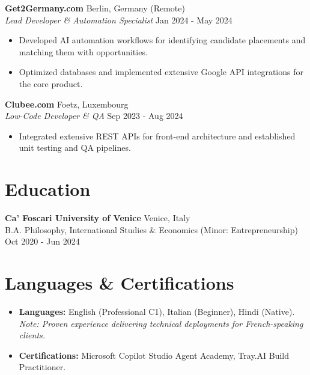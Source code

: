 \documentclass[11pt,a4paper]{article}
\begin{document}
\vspace{0.5em}
\noindent
\textbf{Get2Germany.com} \hfill Berlin, Germany (Remote)\\
\textit{Lead Developer \& Automation Specialist} \hfill Jan 2024 - May 2024
\begin{itemize}[leftmargin=*,noitemsep]
    \item Developed AI automation workflows for identifying candidate placements and matching them with opportunities.
    \item Optimized databases and implemented extensive Google API integrations for the core product.
\end{itemize}

\vspace{0.5em}
\noindent
\textbf{Clubee.com} \hfill Foetz, Luxembourg\\
\textit{Low-Code Developer \& QA} \hfill Sep 2023 - Aug 2024
\begin{itemize}[leftmargin=*,noitemsep]
    \item Integrated extensive REST APIs for front-end architecture and established unit testing and QA pipelines.
\end{itemize}

\section{Education}
\noindent
\textbf{Ca' Foscari University of Venice} \hfill Venice, Italy\\
B.A. Philosophy, International Studies \& Economics (Minor: Entrepreneurship) \hfill Oct 2020 - Jun 2024

\section{Languages \& Certifications}
\begin{itemize}[leftmargin=*,noitemsep]
    \item \textbf{Languages:} English (Professional C1), Italian (Beginner), Hindi (Native). \textit{Note: Proven experience delivering technical deployments for French-speaking clients.}
    \item \textbf{Certifications:} Microsoft Copilot Studio Agent Academy, Tray.AI Build Practitioner.
\end{itemize}
\end{document}
